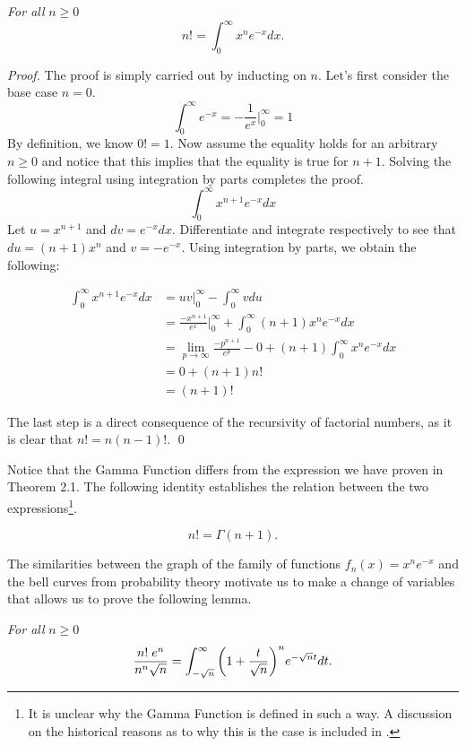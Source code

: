\documentclass[12pt]{article}
\begin{document}
 \textit{For all} $n\geq0$ $$n!=\int_0^\infty x^ne^{-x}dx.$$

\noindent \textit{Proof.} The proof is simply carried out by inducting on $n$. Let's first consider the base case $n=0$. $$\int_0^\infty e^{-x}=-\frac{1}{e^x}\bigg|_0^\infty=1$$ By definition, we know $0!=1$. Now assume the equality holds for an arbitrary $n\geq0$ and notice that this implies that the equality is true for $n+1$. Solving the following integral using integration by parts completes the proof. $$\int_0^\infty x^{n+1}e^{-x}dx$$ Let $u=x^{n+1}$ and $dv=e^{-x}dx$. Differentiate and integrate respectively to see that $du=(n+1)x^n$ and $v=-e^{-x}$. Using integration by parts, we obtain the following:

\begin{align*}
    \int_0^\infty x^{n+1}e^{-x}dx&= uv\bigg|_0^\infty-\int_0^\infty vdu\\
&=\frac{-x^{n+1}}{e^{x}}\bigg|_{0}^\infty +\int_0^\infty (n+1)x^ne^{-x}dx \\
&=\lim_{p\to \infty}\frac{-p^{n+1}}{e^{p}}-0+(n+1)\int_0^\infty x^ne^{-x}dx\\
&= 0+(n+1)n! \\
&= (n+1)!
\end{align*}
    
\noindent The last step is a direct consequence of the recursivity of factorial numbers, as it is clear that $n!=n(n-1)!$.
\qed

\vspace{3mm}

\noindent Notice that the Gamma Function differs from the expression we have proven in Theorem 2.1. The following identity establishes the relation between the two expressions\footnote{It is unclear why the Gamma Function is defined in such a way. A discussion on the historical reasons as to why this is the case is included in \cite{r1}.}.

$$n!=\Gamma(n+1).$$

\noindent The similarities between the graph of the family of functions $f_n(x)=x^ne^{-x}$ and the bell curves from probability theory \cite{r2} motivate us to make a change of variables that allows us to prove the following lemma.

\vspace{3mm}

 \textit{For all} $n\geq 0$ $$\frac{ n!\hspace{1mm}e^n}{n^n\sqrt{n}}=\int_{-\sqrt{n}}^\infty \bigg( 1+\frac{t}{\sqrt{n}}\bigg)^ne^{-\sqrt{n}t}dt.$$ 
\end{document}
